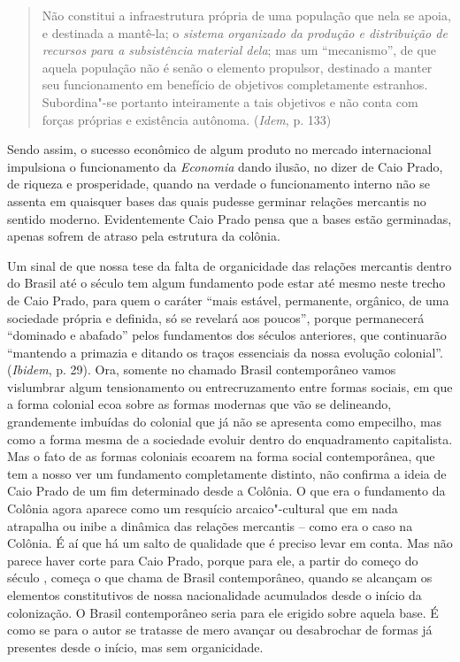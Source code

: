 {\begin{quote}
Não constitui a infraestrutura própria de uma população que nela se
apoia, e destinada a mantê-la; o \emph{sistema organizado da produção e
distribuição de recursos para a subsistência material dela}; mas um
``mecanismo'', de que aquela população não é senão o elemento propulsor,
destinado a manter seu funcionamento em benefício de objetivos
completamente estranhos. Subordina"-se portanto inteiramente a tais
objetivos e não conta com forças próprias e existência autônoma.
(\emph{Idem}, p. 133)
\end{quote}

Sendo assim, o sucesso econômico de algum produto no mercado
internacional impulsiona o funcionamento da \emph{Economia} dando
ilusão, no dizer de Caio Prado, de riqueza e prosperidade, quando na
verdade o funcionamento interno não se assenta em quaisquer bases das
quais pudesse germinar relações mercantis no sentido moderno.
Evidentemente Caio Prado pensa que a bases estão
germinadas, apenas sofrem de atraso pela estrutura da colônia.

Um sinal de que nossa tese da falta de organicidade das relações
mercantis dentro do Brasil até o século  tem algum fundamento pode
estar até mesmo neste trecho de Caio Prado, para quem o caráter ``mais
estável, permanente, orgânico, de uma sociedade própria e definida, só
se revelará aos poucos'', porque permanecerá ``dominado e abafado''
pelos fundamentos dos séculos anteriores, que continuarão ``mantendo a
primazia e ditando os traços essenciais da nossa evolução colonial''.
(\emph{Ibidem}, p. 29). Ora, somente no chamado Brasil
contemporâneo vamos vislumbrar algum tensionamento ou
entrecruzamento entre formas sociais, em que a forma colonial ecoa sobre
as formas modernas que vão se delineando, grandemente imbuídas do
colonial que já não se apresenta como empecilho, mas como a forma mesma de
a sociedade evoluir dentro do enquadramento capitalista. Mas o fato de as
formas coloniais ecoarem na forma social contemporânea, que tem a nosso
ver um fundamento completamente distinto, não confirma a ideia de Caio
Prado de um fim determinado desde a Colônia. O que era o fundamento da
Colônia agora aparece como um resquício arcaico"-cultural que em nada atrapalha ou
inibe a dinâmica das relações mercantis -- como era o caso na Colônia. É
aí que há um salto de qualidade que é preciso levar em conta. Mas não
parece haver corte para Caio Prado, porque para ele, a partir do começo
do século , começa o que chama de Brasil contemporâneo, quando se
alcançam os elementos constitutivos de nossa nacionalidade acumulados
desde o início da colonização. O Brasil contemporâneo seria para ele
erigido sobre aquela base. É como se para o autor se tratasse de mero
avançar ou desabrochar de formas já presentes desde o início, mas sem
organicidade.

}
